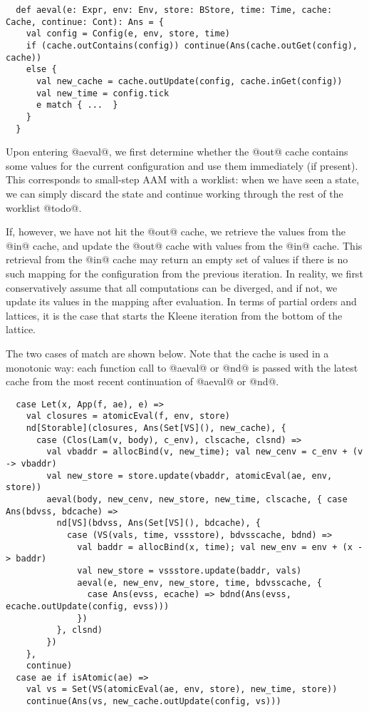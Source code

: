 \documentclass[acmsmall, review]{acmart}\settopmatter{}
\begin{document}
\begin{lstlisting}
  def aeval(e: Expr, env: Env, store: BStore, time: Time, cache: Cache, continue: Cont): Ans = {
    val config = Config(e, env, store, time)
    if (cache.outContains(config)) continue(Ans(cache.outGet(config), cache))
    else {
      val new_cache = cache.outUpdate(config, cache.inGet(config))
      val new_time = config.tick 
      e match { ...  }
    }
  }
\end{lstlisting}

Upon entering @aeval@, we first determine whether the @out@ cache
contains some values for the current configuration and use them immediately (if present).
This corresponds to small-step AAM with a worklist: when we have seen a state,
we can simply discard the state and continue working through the rest of the worklist @todo@.

If, however, we have not hit the @out@ cache, we retrieve the values from the @in@ cache, 
and update the @out@ cache with values from the @in@ cache. This retrieval from the @in@ 
cache may return an empty set of values if there is no such mapping for the configuration 
from the previous iteration.
In reality, we first conservatively assume that all computations can be diverged, and if 
not, we update its values in the mapping after evaluation. In terms of partial orders and 
lattices, it is the case that starts the Kleene iteration from the bottom of the lattice.

The two cases of match are shown below. Note that the cache is used in a monotonic way: 
each function call to @aeval@ or @nd@ is passed with the latest cache from the most recent 
continuation of @aeval@ or @nd@.

\begin{lstlisting}
  case Let(x, App(f, ae), e) =>
    val closures = atomicEval(f, env, store)
    nd[Storable](closures, Ans(Set[VS](), new_cache), {
      case (Clos(Lam(v, body), c_env), clscache, clsnd) =>
        val vbaddr = allocBind(v, new_time); val new_cenv = c_env + (v -> vbaddr)
        val new_store = store.update(vbaddr, atomicEval(ae, env, store))
        aeval(body, new_cenv, new_store, new_time, clscache, { case Ans(bdvss, bdcache) =>
          nd[VS](bdvss, Ans(Set[VS](), bdcache), {
            case (VS(vals, time, vssstore), bdvsscache, bdnd) =>
              val baddr = allocBind(x, time); val new_env = env + (x -> baddr)
              val new_store = vssstore.update(baddr, vals)
              aeval(e, new_env, new_store, time, bdvsscache, {
                case Ans(evss, ecache) => bdnd(Ans(evss, ecache.outUpdate(config, evss)))
              })
          }, clsnd)
        })
    },
    continue)
  case ae if isAtomic(ae) =>
    val vs = Set(VS(atomicEval(ae, env, store), new_time, store))
    continue(Ans(vs, new_cache.outUpdate(config, vs)))
\end{lstlisting}
\end{document}

